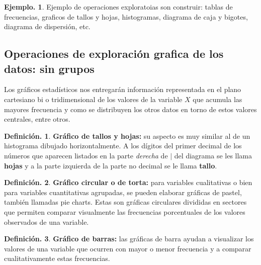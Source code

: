 \documentclass[]{book}
\theoremstyle{definition}
\newtheorem{definition}{Definición.}[chapter]
\theoremstyle{definition}
\newtheorem{example}{Ejemplo.}[chapter]
\theoremstyle{definition}
\theoremstyle{remark}
\begin{document}
\begin{example}
\protect\hypertarget{exm:unnamed-chunk-69}{}{\label{exm:unnamed-chunk-69} }Ejemplo de operaciones exploratoias son construir: tablas
de frecuencias, graficos de tallos y
hojas, histogramas, diagrama de caja y bigotes, diagrama
de dispersión, etc.
\end{example}

\hypertarget{operaciones-de-exploraciuxf3n-grafica-de-los-datos-sin-grupos}{%
\subsection{Operaciones de exploración grafica de los datos: sin grupos}\label{operaciones-de-exploraciuxf3n-grafica-de-los-datos-sin-grupos}}

Los gráficos estadísticos nos entregarán información
representada en el plano cartesiano bi o
tridimensional de los valores de la variable \(X\) que
acumula las mayores frecuencia y como se
distribuyen los otros datos en torno de estos valores
centrales, entre otros.

\begin{definition}
\protect\hypertarget{def:unnamed-chunk-70}{}{\label{def:unnamed-chunk-70} }
\textbf{Gráfico de tallos y hojas:} su aspecto es muy similar al de un
histograma dibujado horizontalmente. A los dígitos del primer
decimal de los números que aparecen listados en la parte
\emph{derecha} de \(|\) del diagrama se les llama \textbf{hojas} y a la parte
izquierda de la parte no decimal se le llama \textbf{tallo}.
\end{definition}

\begin{definition}
\protect\hypertarget{def:unnamed-chunk-71}{}{\label{def:unnamed-chunk-71} }\textbf{Gráfico circular o de torta:} para variables cualitativas o
bien para
variables cuantitativas agrupadas,
se pueden elaborar gráficas de pastel, también llamadas
pie charts. Estas son gráficas circulares divididas en sectores
que permiten comparar visualmente
las frecuencias porcentuales de los valores observados de
una variable.
\end{definition}

\begin{definition}
\protect\hypertarget{def:unnamed-chunk-72}{}{\label{def:unnamed-chunk-72} }
\textbf{Gráfico de barras:} las gráficas de barra ayudan a visualizar
los valores de una variable que
ocurren con mayor o menor frecuencia y a comparar
cualitativamente estas
frecuencias.
\end{definition}
\end{document}
